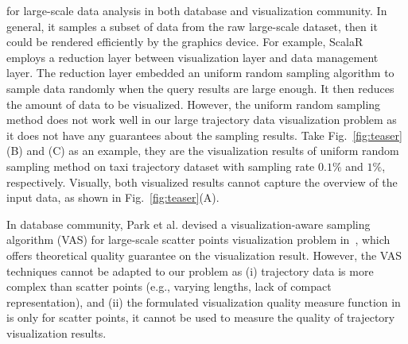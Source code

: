  for large-scale data analysis in both database and visualization community.
In general, it samples a subset of data from the raw large-scale dataset, then it could be rendered efficiently by the graphics device.
For example, ScalaR~\cite{battle2013dynamic} employs a reduction layer between visualization layer and data management layer.
The reduction layer embedded an uniform random sampling algorithm to sample data randomly when the query results are large enough.
It then reduces the amount of data to be visualized.
However, the uniform random sampling method does not work well in our large trajectory data visualization problem as it does not have any guarantees about the sampling results.
Take Fig.~\ref{fig:teaser}(B) and (C) as an example,
they are the visualization results of uniform random sampling method on \pt{} taxi trajectory dataset with sampling rate $0.1\%$ and $1\%$, respectively.
Visually, both visualized results cannot capture the overview of the input data, as shown in Fig.~\ref{fig:teaser}(A).

In database community,  Park et al. devised a visualization-aware sampling algorithm (VAS) for large-scale scatter points visualization problem in~\cite{park2016visualization},
which offers theoretical quality guarantee on the visualization result.
However, the VAS techniques cannot be adapted to our problem as  (i) trajectory data is  more complex than scatter points (e.g., varying lengths, lack of compact representation),
and  (ii) the formulated visualization quality measure function in~\cite{park2016visualization} is only for scatter points, it cannot be used to measure the quality of trajectory visualization results.

